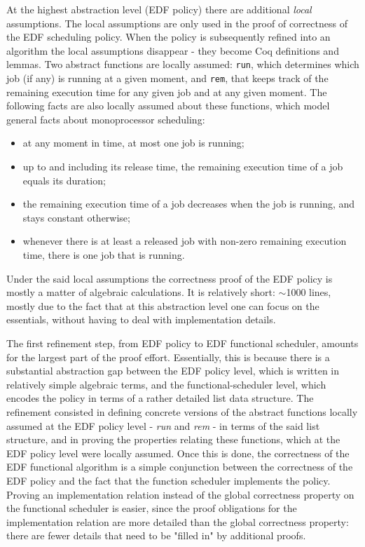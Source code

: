 	At the highest abstraction level (EDF policy) there are additional \emph{local} assumptions.
	The local assumptions are only used in the proof of correctness of the EDF scheduling policy. When the policy is subsequently
	refined into an algorithm the local assumptions disappear - they become Coq definitions and lemmas.
	Two abstract functions are locally assumed: \texttt{run}, which determines which job (if any) is  running at a given moment, and \texttt{rem}, that keeps track of the remaining execution time for any given job and at any given moment.
	The following facts are also locally assumed about these functions, which model general facts about monoprocessor scheduling:
	
	\begin{itemize}
		\item at any moment in time, at most one job is running;
		\item up to and including its release time, the remaining execution time of a job equals its duration;
		\item the remaining execution time of a job decreases when the job is running, and stays constant otherwise;
		\item whenever there is at least a released job with non-zero remaining execution time, there is one job that is running.
	\end{itemize}

	Under the said local assumptions the correctness proof of the EDF policy is mostly a matter of algebraic calculations. It is relatively short: $\sim$1000 lines, mostly due to the fact that at this abstraction level one can focus on the essentials, without having to deal with implementation details.

	The first refinement step, from EDF policy to EDF functional scheduler, amounts for the largest part of the proof effort. Essentially, this is because there is a substantial abstraction gap between the EDF policy level, which is written in relatively simple algebraic terms, and the functional-scheduler level, which encodes the policy in terms of a rather detailed list data structure. The refinement consisted in defining concrete versions of the abstract functions locally assumed at the EDF policy level - \emph{run} and \emph{rem} - in terms of the said list structure, and in proving the properties relating these functions, which at the EDF policy level were locally assumed. Once this is done, the correctness of the EDF functional algorithm is a simple conjunction between the correctness of the EDF policy and the fact that the function scheduler implements the policy. Proving an implementation relation instead of the global correctness property on the functional scheduler is easier, since the proof obligations for the implementation relation are more detailed than the global correctness property: there are fewer details that need to be "filled in" by additional proofs.

